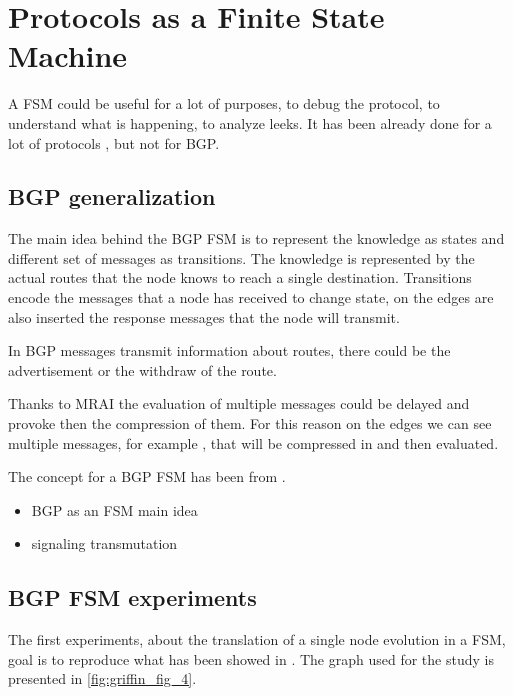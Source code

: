 \chapter{Protocols as a Finite State Machine}
\label{cha:bgp_fsm}

A \ac{FSM} could be useful for a lot of purposes, to debug the protocol, to 
understand what is happening, to analyze leeks.
It has been already done for a lot of protocols , but 
not for \ac{BGP}.


\section{BGP generalization}
\label{sec:bgp_generalization}

The main idea behind the \ac{BGP} \ac{FSM} is to represent the knowledge as
states and different set of messages as transitions.
The knowledge is represented by the actual routes that the node knows to reach
a single destination.
Transitions encode the messages that a node has received to change state,
on the edges are also inserted the response messages that the node will transmit.


In \ac{BGP} messages transmit information about routes, there could be the advertisement
or the withdraw of the route.

Thanks to \ac{MRAI} the evaluation of multiple messages could be delayed and
provoke then the compression of them.
For this reason on the edges we can see multiple messages, for example 
, that will be compressed in  and then evaluated.

The concept for a \ac{BGP} \ac{FSM} has been  from \cite{griffinFSM}.

\begin{itemize}
    \item BGP as an FSM main idea
    \item signaling transmutation
\end{itemize}

\section{BGP FSM experiments}
\label{sec:bgp_fsm_experiments}

The first experiments, about the translation of a single node evolution in a
\ac{FSM}, goal is to reproduce what has been showed in \cite{griffinFSM}.
The graph used for the study is presented in \cref{fig:griffin_fig_4}.

